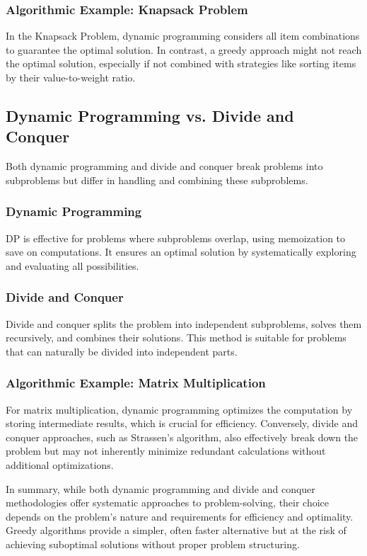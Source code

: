 \documentclass[12pt]{book} %
\begin{document}
\subsubsection{Algorithmic Example: Knapsack Problem}
In the Knapsack Problem, dynamic programming considers all item combinations to guarantee the optimal solution. In contrast, a greedy approach might not reach the optimal solution, especially if not combined with strategies like sorting items by their value-to-weight ratio.

\subsection{Dynamic Programming vs. Divide and Conquer}

Both dynamic programming and divide and conquer break problems into subproblems but differ in handling and combining these subproblems.

\subsubsection{Dynamic Programming}
DP is effective for problems where subproblems overlap, using memoization to save on computations. It ensures an optimal solution by systematically exploring and evaluating all possibilities.

\subsubsection{Divide and Conquer}
Divide and conquer splits the problem into independent subproblems, solves them recursively, and combines their solutions. This method is suitable for problems that can naturally be divided into independent parts.

\subsubsection{Algorithmic Example: Matrix Multiplication}
For matrix multiplication, dynamic programming optimizes the computation by storing intermediate results, which is crucial for efficiency. Conversely, divide and conquer approaches, such as Strassen's algorithm, also effectively break down the problem but may not inherently minimize redundant calculations without additional optimizations.

In summary, while both dynamic programming and divide and conquer methodologies offer systematic approaches to problem-solving, their choice depends on the problem's nature and requirements for efficiency and optimality. Greedy algorithms provide a simpler, often faster alternative but at the risk of achieving suboptimal solutions without proper problem structuring.
\end{document}
